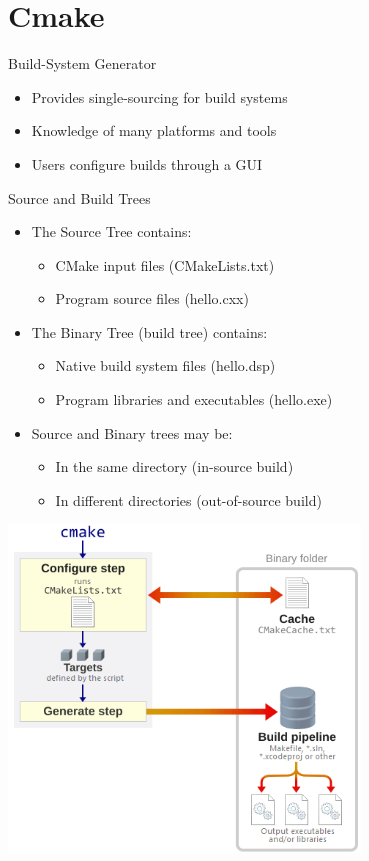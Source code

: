 \documentclass[xcolor=x11names,compress]{beamer}
\renewcommand{\(}{\begin{columns}}
\renewcommand{\)}{\end{columns}}
\newcommand{\<}[1]{\begin{column}{#1}}
\renewcommand{\>}{\end{column}}
\begin{document}
\section{Cmake}
\begin{frame}{Build-System Generator}
	\begin{itemize}
		\item Provides single-sourcing for build systems
		\item Knowledge of many platforms and tools
		\item Users configure builds through a GUI
	\end{itemize}
	\end{frame}
\begin{frame}{	Source and Build Trees		}
	\begin{itemize}				
		\item	The Source Tree contains:
		\begin{itemize}
		\item CMake input files (CMakeLists.txt)
		\item Program source files (hello.cxx)
		\end{itemize}
		\item	The Binary Tree (build tree) contains:
			\begin{itemize}			
		\item Native build system files (hello.dsp)
		\item Program libraries and executables (hello.exe)
		\end{itemize}			
		\item Source and Binary trees may be:
		\begin{itemize}
		\item In the same directory (in-source build)
		\item In different directories (out-of-source build)
		\end{itemize}
	\end{itemize}	
\end{frame}	
\begin{frame}
	\includegraphics[width = 0.7\textwidth,height = 0.7\textheight]{s13.png}
\end{frame}			
\end{document}
